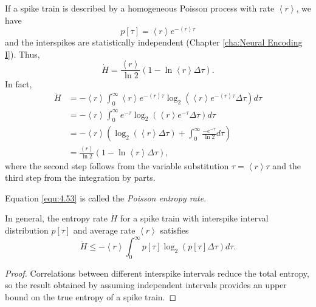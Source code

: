\begin{exm}
  If a spike train is described by a homogeneous Poisson process with rate $\left<r\right>$, we have
  \begin{displaymath}
    p[\tau] = \left<r\right>e^{-\left<r\right>\tau}
  \end{displaymath}
  and the interspikes are statistically independent (Chapter \ref{cha:Neural Encoding I}). Thus,
  \begin{equation}
    \label{equ:4.53}
    \dot{H} = \frac{\left<r\right>}{\ln 2}(1-\ln\left<r\right>\Delta\tau).
  \end{equation}
  In fact,
  \begin{displaymath}
    \begin{aligned}
      \dot{H} &= -\left<r\right>\int_0^{\infty}\left<r\right>e^{-\left<r\right>\tau}\log_2(\left<r\right>e^{-\left<r\right>\tau}\Delta\tau)d\tau\\
      &= -\left<r\right>\int_0^{\infty}e^{-\tau}\log_2(\left<r\right>e^{-\tau}\Delta\tau)d\tau\\
      &= -\left<r\right>\left(\log_2(\left<r\right>\Delta\tau) + \int_0^{\infty}\frac{-e^{-\tau}}{\ln 2}d\tau\right) \\
      &= \frac{\left<r\right>}{\ln 2}(1-\ln\left<r\right>\Delta\tau),
    \end{aligned}
  \end{displaymath}
  where the second step follows from the variable substitution $\tau = \left<r\right> \tau$ and the third step from the integration by parts.
\end{exm}

\begin{defn}
  \label{PossionEntropyRate}
  Equation \ref{equ:4.53} is called the \emph{Poisson entropy rate}.
\end{defn}

\begin{thm}
  In general, the entropy rate $\dot{H}$ for a spike train with interspike interval distribution $p[\tau]$ and average rate $\left<r\right>$ satisfies
  \begin{equation}
    \label{equ:4.52}
    \dot{H} \leq -\left<r\right>\int_0^{\infty}p[\tau]\log_2(p[\tau]\Delta\tau)d\tau.
  \end{equation}
\end{thm}
\begin{proof}
  Correlations between different interspike intervals reduce the total entropy, so the result obtained by assuming independent intervals provides an upper bound on the true entropy of a spike train.
\end{proof}

